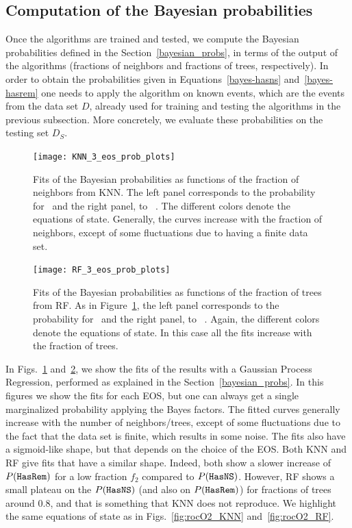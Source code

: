 \subsection{Computation of the Bayesian probabilities}

Once the algorithms are trained and tested, we compute the Bayesian
probabilities defined in the Section~\ref{bayesian_probs}, in terms of the 
output of the algorithms (fractions of neighbors and fractions of trees, 
respectively). In order to obtain the probabilities given in 
Equations~\ref{bayes-hasns} and~\ref{bayes-hasrem} one needs to apply
 the algorithm on known events, which are the events from the data set $D$, already used for training and testing the algorithms in the previous subsection. More concretely, we evaluate these probabilities on the testing set $D_S$.

\begin{figure}%
\texttt{[image: KNN\_3\_eos\_prob\_plots]}
\caption{Fits of the Bayesian probabilities as functions of the fraction of neighbors from \ac{KNN}. The left panel corresponds to the probability for \hasns\ and the right panel, to \hasrem\ . The different colors denote the equations of state. Generally, the curves increase with the fraction of neighbors, except of some fluctuations due to having a finite data set.}
\label{fig:bayesian_prob_fits_KNN}
\end{figure}

\begin{figure}%
\texttt{[image: RF\_3\_eos\_prob\_plots]}
\caption{Fits of the Bayesian probabilities as functions of the fraction of trees from \ac{RF}. As in Figure~\ref{fig:bayesian_prob_fits_KNN}, the left panel corresponds to the probability for \hasns\ and the right panel, to \hasrem\ . Again, the different colors denote the equations of state. In this case all the fits increase with the fraction of trees.}
\label{fig:bayesian_prob_fits_RF}
\end{figure}

In Figs.~\ref{fig:bayesian_prob_fits_KNN} and~\ref{fig:bayesian_prob_fits_RF}, 
we show the fits of  the results with a Gaussian Process Regression,
performed as explained in the Section~\ref{bayesian_probs}. In this figures we show
the fits for each EOS, but one can always get a single marginalized probability
applying the Bayes factors. The fitted curves generally increase with the number of neighbors/trees, except of some fluctuations due to the fact that the data set is finite, which results in some noise. The fits also have a
sigmoid-like shape, but that depends on the choice of the EOS. Both \ac{KNN}
and \ac{RF} give fits that have a similar shape. Indeed, both show a slower
increase of $P({{\tt HasRem}})$ for a low fraction $f_2$ compared to $P({{\tt HasNS}})$.
However, \ac{RF} shows a small plateau on the $P({{\tt HasNS}})$ (and also on
$P({{\tt HasRem}})$) for fractions of trees around $0.8$, and that is something that
\ac{KNN} does not reproduce. We highlight the same equations of state as in
Figs.~\ref{fig:rocO2_KNN} and~\ref{fig:rocO2_RF}.

